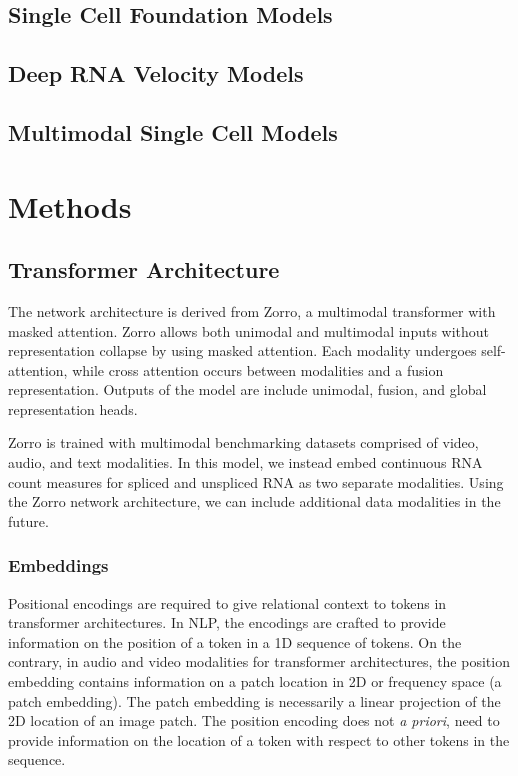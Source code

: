 \documentclass{article} %
\begin{document}
  \subsection{Single Cell Foundation Models}
  \subsection{Deep RNA Velocity Models}
  \subsection{Multimodal Single Cell Models}
  \section{Methods}
  \subsection{Transformer Architecture}
The network architecture is derived from Zorro, a multimodal transformer with masked attention. Zorro allows both unimodal and multimodal inputs without representation collapse by using masked attention. Each modality undergoes self-attention, while cross attention occurs between modalities and a fusion representation. Outputs of the model are include unimodal, fusion, and global representation heads.

Zorro is trained with multimodal benchmarking datasets comprised of video, audio, and text modalities. In this model, we instead embed continuous RNA count measures for spliced and unspliced RNA as two separate modalities. Using the Zorro network architecture, we can include additional data modalities in the future.

  \subsubsection{Embeddings}
Positional encodings are required to give relational context to tokens in transformer architectures. In NLP, the encodings are crafted to provide information on the position of a token in a 1D sequence of tokens. On the contrary, in audio and video modalities for transformer architectures, the position embedding contains information on a patch location in 2D or frequency space (a patch embedding). The patch embedding is necessarily a linear projection of the 2D location of an image patch. The position encoding does not \textit{a priori}, need to provide information on the location of a token with respect to other tokens in the sequence. 
\end{document}
